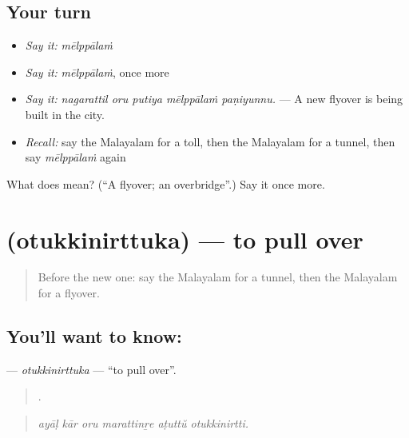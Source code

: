 \subsection*{Your turn}
\begin{itemize}
\raggedright
  \item \emph{Say it:} \emph{mēlppālaṁ}
  \item \emph{Say it:} \emph{mēlppālaṁ}, once more
  \item \emph{Say it:} \emph{nagarattil oru putiya mēlppālaṁ paṇiyunnu.} — A new flyover is being built in the city.
  \item \emph{Recall:} say the Malayalam for a toll, then the Malayalam for a tunnel, then say \emph{mēlppālaṁ} again
\end{itemize}

\begin{tcolorbox}[breakable,colback=teal!4,colframe=teal!35!black,title={Before you move on}]
What does  mean? (\textquotedblleft{}A flyover; an overbridge\textquotedblright{}.) Say it once more.
\end{tcolorbox}
\section[\texorpdfstring{\ml{ഒതുക്കിനിർത്തുക} (otukkinirttuka)}{ഒതുക്കിനിർത്തുക (otukkinirttuka)}]{ (otukkinirttuka) — to pull over}

\label{lesson:ML-C468-otukkinirttuka}



\begin{quote}
Before the new one: say the Malayalam for a tunnel, then the Malayalam for a flyover.
\end{quote}

\subsection*{You'll want to know: }
\textbf{} — \emph{otukkinirttuka} — \textquotedblleft{}to pull over\textquotedblright{}.

\begin{quote}
     .
\end{quote}

\begin{quote}
\emph{ayāḷ kār oru marattinṟe aṭuttŭ otukkinirtti.}
\end{quote}


